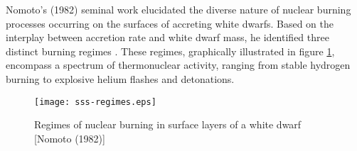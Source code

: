         	Nomoto's (1982) seminal work elucidated the diverse nature of nuclear burning processes occurring on the surfaces of accreting white dwarfs. Based on the interplay between accretion rate and white dwarf mass, he identified three distinct burning regimes \cite{nomoto82}. These regimes, graphically illustrated in figure \ref{fig:regimes-wd}, encompass a spectrum of thermonuclear activity, ranging from stable hydrogen burning to explosive helium flashes and detonations.
        	
        	\begin{figure}[h!]
        		\begin{center}
        			\texttt{[image: sss-regimes.eps]}
        			\caption{Regimes of nuclear burning in surface layers of a white dwarf [Nomoto (1982)]}
        			\label{fig:regimes-wd}
        		\end{center}
        	\end{figure}
        	
